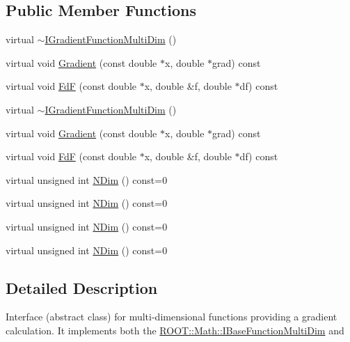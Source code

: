 \subsection*{Public Member Functions}
\begin{DoxyCompactItemize}
\item 
virtual \mbox{\hyperlink{classROOT_1_1Math_1_1IGradientFunctionMultiDim_acf38237d4059f324c24703ec0ee659bb}{$\sim$\+I\+Gradient\+Function\+Multi\+Dim}} ()
\item 
virtual void \mbox{\hyperlink{classROOT_1_1Math_1_1IGradientFunctionMultiDim_ab65a713d2637c69b334d2119ef4f0e26}{Gradient}} (const double $\ast$x, double $\ast$grad) const
\item 
virtual void \mbox{\hyperlink{classROOT_1_1Math_1_1IGradientFunctionMultiDim_a58cefd2806ec7b9d389911800ed60386}{FdF}} (const double $\ast$x, double \&f, double $\ast$df) const
\item 
virtual \mbox{\hyperlink{classROOT_1_1Math_1_1IGradientFunctionMultiDim_acf38237d4059f324c24703ec0ee659bb}{$\sim$\+I\+Gradient\+Function\+Multi\+Dim}} ()
\item 
virtual void \mbox{\hyperlink{classROOT_1_1Math_1_1IGradientFunctionMultiDim_ab65a713d2637c69b334d2119ef4f0e26}{Gradient}} (const double $\ast$x, double $\ast$grad) const
\item 
virtual void \mbox{\hyperlink{classROOT_1_1Math_1_1IGradientFunctionMultiDim_a58cefd2806ec7b9d389911800ed60386}{FdF}} (const double $\ast$x, double \&f, double $\ast$df) const
\item 
virtual unsigned int \mbox{\hyperlink{classROOT_1_1Math_1_1IGradientFunctionMultiDim_af046a6f630930e59fe5356a9795aec46}{N\+Dim}} () const=0
\item 
virtual unsigned int \mbox{\hyperlink{classROOT_1_1Math_1_1IGradientFunctionMultiDim_af046a6f630930e59fe5356a9795aec46}{N\+Dim}} () const=0
\item 
virtual unsigned int \mbox{\hyperlink{classROOT_1_1Math_1_1IGradientFunctionMultiDim_af046a6f630930e59fe5356a9795aec46}{N\+Dim}} () const=0
\item 
virtual unsigned int \mbox{\hyperlink{classROOT_1_1Math_1_1IGradientFunctionMultiDim_af046a6f630930e59fe5356a9795aec46}{N\+Dim}} () const=0
\end{DoxyCompactItemize}


\subsection{Detailed Description}
Interface (abstract class) for multi-\/dimensional functions providing a gradient calculation. It implements both the \mbox{\hyperlink{classROOT_1_1Math_1_1IBaseFunctionMultiDim}{R\+O\+O\+T\+::\+Math\+::\+I\+Base\+Function\+Multi\+Dim}} and

